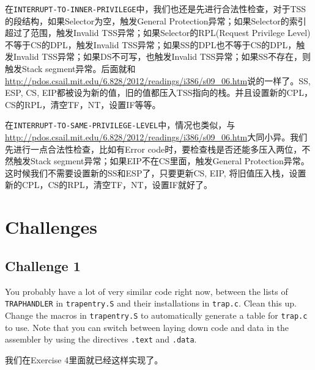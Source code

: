 \documentclass[11pt]{article}
\begin{document}
在\lstinline|INTERRUPT-TO-INNER-PRIVILEGE|中，我们也还是先进行合法性检查，对于TSS的段结构，如果Selector为空，触发General Protection异常；如果Selector的索引超过了范围，触发Invalid TSS异常；如果Selector的RPL(Request Privilege Level)不等于CS的DPL，触发Invalid TSS异常；如果SS的DPL也不等于CS的DPL，触发Invalid TSS异常；如果DS不可写，也触发Invalid TSS异常；如果SS不存在，则触发Stack segment异常。后面就和\url{http://pdos.csail.mit.edu/6.828/2012/readings/i386/s09_06.htm}说的一样了。SS, ESP, CS, EIP都被设为新的值，旧的值都压入TSS指向的栈。并且设置新的CPL，CS的RPL，清空TF，NT，设置IF等等。

在\lstinline|INTERRUPT-TO-SAME-PRIVILEGE-LEVEL|中，情况也类似，与\url{http://pdos.csail.mit.edu/6.828/2012/readings/i386/s09_06.htm}大同小异。我们先进行一点合法性检查，比如有Error code时，要检查栈是否还能多压入两位，不然触发Stack segment异常；如果EIP不在CS里面，触发General Protection异常。这时候我们不需要设置新的SS和ESP了，只要更新CS, EIP, 将旧值压入栈，设置新的CPL，CS的RPL，清空TF，NT，设置IF就好了。

\section{Challenges}
\subsection{Challenge 1}
\begin{framed}
You probably have a lot of very similar code right now, between the lists of \lstinline|TRAPHANDLER| in \lstinline|trapentry.S| and their installations in \lstinline|trap.c|. Clean this up. Change the macros in \lstinline|trapentry.S| to automatically generate a table for \lstinline|trap.c| to use. Note that you can switch between laying down code and data in the assembler by using the directives \lstinline|.text| and \lstinline|.data|. 
\end{framed}
我们在Exercise 4里面就已经这样实现了。
\end{document}
